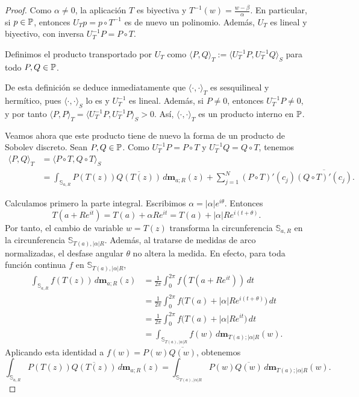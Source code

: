 \begin{proof}
	Como $\alpha\neq 0$, la aplicación $T$ es biyectiva y
	\(
	T^{-1}(w)=\frac{w-\beta}{\alpha}.
	\)
	En particular, si $p\in\mathbb{P}$, entonces $U_Tp=p\circ T^{-1}$ es de nuevo un
	polinomio. Además, $U_T$ es lineal y biyectivo, con inversa
	\(
	U_T^{-1}P=P\circ T.
	\)

	Definimos el producto transportado por $U_T$ como
	\(
	\langle P,Q\rangle_T
	:=
	\langle U_T^{-1}P,U_T^{-1}Q\rangle_S
	\) para todo $P,Q\in\mathbb{P}$.

	De esta definición se deduce inmediatamente que
	$\langle\cdot,\cdot\rangle_T$ es sesquilineal y hermítico, pues
	$\langle\cdot,\cdot\rangle_S$ lo es y $U_T^{-1}$ es lineal. Además, si
	$P\neq 0$, entonces $U_T^{-1}P\neq 0$, y por tanto
	\(
	\langle P,P\rangle_T
	=
	\langle U_T^{-1}P,U_T^{-1}P\rangle_S
	>
	0.
	\)
	Así, $\langle\cdot,\cdot\rangle_T$ es un producto interno en $\mathbb{P}$.

	Veamos ahora que este producto tiene de nuevo la forma de un producto de
	Sobolev discreto. Sean $P,Q\in\mathbb{P}$. Como $U_T^{-1}P=P\circ T$ y
	$U_T^{-1}Q=Q\circ T$, tenemos
	\[
		\begin{aligned}
			\langle P,Q\rangle_T
			 & =
			\langle P\circ T,Q\circ T\rangle_S \\
			 & =
			\int_{\mathbb S_{a,R}}
			P(T(z))\overline{Q(T(z))}\,d\mathbf m_{a;R}(z)
			+
			\sum_{j=1}^N
			(P\circ T)'(c_j)\overline{(Q\circ T)'(c_j)}.
		\end{aligned}
	\]

	Calculamos primero la parte integral. Escribimos
	$\alpha=|\alpha|e^{i\theta}$. Entonces
	\[
		T(a+Re^{it})
		=
		T(a)+\alpha Re^{it}
		=
		T(a)+|\alpha|R e^{i(t+\theta)}.
	\]
	Por tanto, el cambio de variable $w=T(z)$ transforma la circunferencia
	$\mathbb S_{a,R}$ en la circunferencia
	$\mathbb S_{T(a),|\alpha|R}$. Además, al tratarse de medidas de arco
	normalizadas, el desfase angular $\theta$ no altera la medida. En efecto,
	para toda función continua $f$ en $\mathbb S_{T(a),|\alpha|R}$,
	\[
		\begin{aligned}
			\int_{\mathbb S_{a,R}} f(T(z))\,d\mathbf m_{a;R}(z)
			 & =
			\frac{1}{2\pi}
			\int_0^{2\pi}
			f(T(a+Re^{it}))\,dt                             \\
			 & =
			\frac{1}{2\pi}
			\int_0^{2\pi}
			f\bigl(T(a)+|\alpha|R e^{i(t+\theta)}\bigr)\,dt \\
			 & =
			\frac{1}{2\pi}
			\int_0^{2\pi}
			f\bigl(T(a)+|\alpha|R e^{it}\bigr)\,dt          \\
			 & =
			\int_{\mathbb S_{T(a),|\alpha|R}}
			f(w)\,d\mathbf m_{T(a);|\alpha|R}(w).
		\end{aligned}
	\]
	Aplicando esta identidad a $f(w)=P(w)\overline{Q(w)}$, obtenemos
	\[
		\int_{\mathbb S_{a,R}}
		P(T(z))\overline{Q(T(z))}\,d\mathbf m_{a;R}(z)
		=
		\int_{\mathbb S_{T(a),|\alpha|R}}
		P(w)\overline{Q(w)}\,d\mathbf m_{T(a);|\alpha|R}(w).
	\]


\end{proof}
